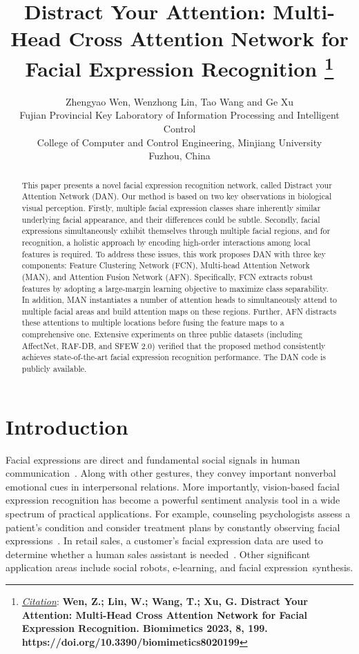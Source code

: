 \documentclass{article}
\title{Distract Your Attention: Multi-Head Cross Attention Network for Facial Expression Recognition
\thanks{\textit{\underline{Citation}}: 
\textbf{Wen, Z.; Lin, W.; Wang, T.; Xu, G. Distract Your Attention: Multi-Head Cross Attention Network for Facial Expression Recognition. Biomimetics 2023, 8, 199. https://doi.org/10.3390/biomimetics8020199}} 
}
\author{
  Zhengyao Wen, Wenzhong Lin, Tao Wang and Ge Xu \\
  Fujian Provincial Key Laboratory of Information Processing and Intelligent Control\\ College of Computer and Control Engineering, Minjiang University \\
  Fuzhou, China
}
\begin{document}
\maketitle


\begin{abstract}
This paper presents a novel facial expression recognition network, called Distract your Attention Network (DAN). Our method is based on two key observations in biological visual perception. Firstly, multiple facial expression classes share inherently similar underlying facial appearance, and their differences could be subtle. Secondly, facial expressions simultaneously exhibit themselves through multiple facial regions, and for recognition, a holistic approach by encoding high-order interactions among local features is required.
To address these issues, this work proposes DAN with three key components: Feature Clustering Network (FCN), Multi-head Attention Network (MAN), and Attention Fusion Network (AFN). Specifically, FCN extracts robust features by adopting a large-margin learning objective to maximize class separability. In addition, MAN instantiates a number of attention heads to simultaneously attend to multiple facial areas and build attention maps on these regions. Further, AFN distracts these attentions to multiple locations before fusing the feature maps to a comprehensive one. Extensive experiments on three public datasets (including AffectNet, RAF-DB, and SFEW 2.0) verified that the proposed method consistently achieves state-of-the-art facial expression recognition performance.
The DAN code is publicly available.
\end{abstract}




\section{Introduction}
\label{sec:intro}
Facial expressions are direct and fundamental social signals in human communication~\cite{ekman1997face,darwin2015expression}. Along with other gestures, they convey important  nonverbal emotional cues in interpersonal relations. More importantly, vision-based
facial expression recognition has become a powerful sentiment analysis tool in a wide spectrum of practical applications.
For example, counseling psychologists assess a patient's condition and consider treatment plans by constantly observing facial expressions~\cite{fasel2003automatic}.
In retail sales, a customer’s facial expression data are used to determine whether a human sales assistant is needed~\cite{shergill2008computerized}.
Other significant application areas include social robots, e-learning, and facial expression~synthesis.
\end{document}
